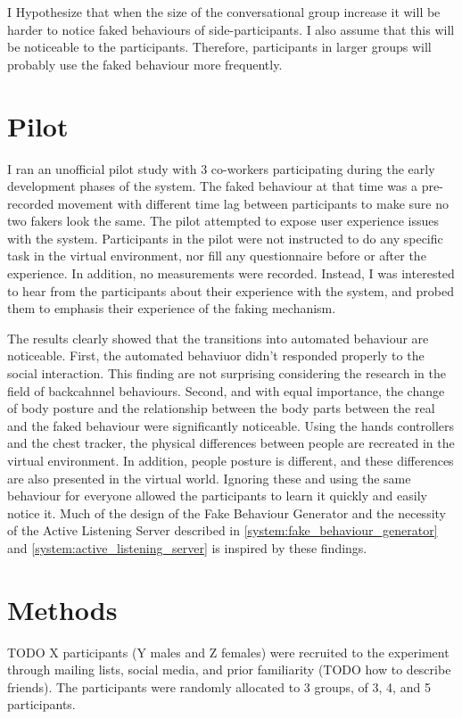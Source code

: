 \documentclass[]{simple-thesis}
\begin{document}
I Hypothesize that when the size of the conversational group increase it will be harder to notice faked behaviours of side-participants.
I also assume that this will be noticeable to the participants.
Therefore, participants in larger groups will probably use the faked behaviour more frequently.

\section{Pilot}

I ran an unofficial pilot study with 3 co-workers participating during the early development phases of the system.
The faked behaviour at that time was a pre-recorded movement with different time lag between participants to make sure no two fakers look the same.
The pilot attempted to expose user experience issues with the system.
Participants in the pilot were not instructed to do any specific task in the virtual environment, nor fill any questionnaire before or after the experience.
In addition, no measurements were recorded.
Instead, I was interested to hear from the participants about their experience with the system, and probed them to emphasis their experience of the faking mechanism.

The results clearly showed that the transitions into automated behaviour are noticeable.
First, the automated behaviuor didn't responded properly to the social interaction.
This finding are not surprising considering the research in the field of backcahnnel behaviours.
Second, and with equal importance, the change of body posture and the relationship between the body parts between the real and the faked behaviour were significantly noticeable.
Using the hands controllers and the chest tracker, the physical differences between people are recreated in the virtual environment.
In addition, people posture is different, and these differences are also presented in the virtual world.
Ignoring these and using the same behaviour for everyone allowed the participants to learn it quickly and easily notice it.
Much of the design of the Fake Behaviour Generator and the necessity of the Active Listening Server described in \ref{system:fake_behaviour_generator} and \ref{system:active_listening_server} is inspired by these findings.

\section{Methods}

TODO X participants (Y males and Z females) were recruited to the experiment through mailing lists, social media, and prior familiarity (TODO how to describe friends).
The participants were randomly allocated to 3 groups, of 3, 4, and 5 participants.
\end{document}
